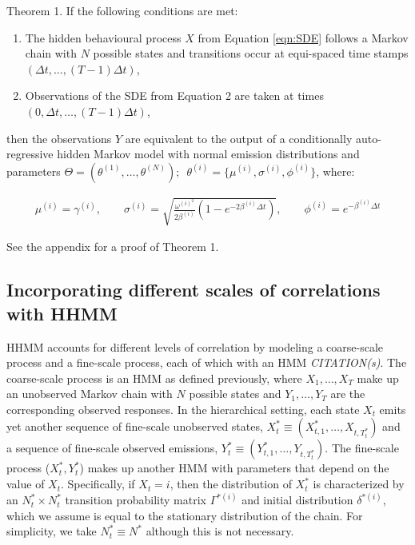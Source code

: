 \begin{theorem}{Theorem 1.}{}%
If the following conditions are met:
\begin{enumerate}
    \item The hidden behavioural process $X$ from Equation \ref{eqn:SDE} follows a Markov chain with $N$ possible states and transitions occur at equi-spaced time stamps $\left(\Delta t, \ldots, (T-1)\Delta t\right)$,
    
    \item Observations of the SDE from Equation 2 are taken at times $\left(0, \Delta t, \ldots, (T-1)\Delta t\right)$,
\end{enumerate}
then the observations $Y$ are equivalent to the output of a conditionally auto-regressive hidden Markov model with normal emission distributions and parameters $\Theta = (\theta^{(1)}, \ldots, \theta^{(N)}); \enspace \theta^{(i)} = \{\mu^{(i)},\sigma^{(i)},\phi^{(i)}\}$, where:

\begin{align}
\mu^{(i)} = \gamma^{(i)}, \qquad \sigma^{(i)} = \sqrt{\frac{\omega^{(i)^2}}{2\beta^{(i)}} (1-e^{-2\beta^{(i)}\Delta t})}, \qquad \phi^{(i)} = e^{-\beta^{(i)}\Delta t} \label{eqn:CarHMM_to_OU}
\end{align}

\end{theorem}

See the appendix for a proof of Theorem 1.

\subsection{Incorporating different scales of correlations with HHMM}

HHMM accounts for different levels of correlation by modeling a coarse-scale process and a fine-scale process, each of which with an HMM \textit{CITATION(s)}. The coarse-scale process is an HMM as defined previously, where $X_1, \ldots, X_T$ make up an unobserved Markov chain with $N$ possible states and $Y_1,\ldots, Y_T$ are the corresponding observed responses.   
%
In the hierarchical setting, each state $X_t$ emits yet another sequence of fine-scale unobserved states, $X_t^* \equiv (X_{t,1}^*,\ldots, X_{t,T_t^*})$ and a sequence of fine-scale observed emissions, $Y_t^* \equiv (Y_{t,1}^*,\ldots, Y_{t,T_t^*})$. The fine-scale process ($X_t^*, Y_t^*$) makes up another HMM with parameters that depend on the value of $X_t$. Specifically, if $X_t=i$, then the distribution of $X_t^*$ is characterized by an $N^*_t \times N^*_t$ transition probability matrix $\Gamma^{*(i)}$ and initial distribution $\delta^{*(i)}$, which we assume is equal to the stationary distribution of the chain. For simplicity, we take $N_t^* \equiv N^*$ although this is not necessary.

